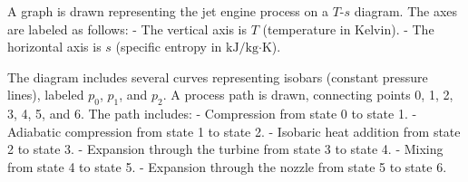 A graph is drawn representing the jet engine process on a \( T \)-\( s \) diagram. The axes are labeled as follows:  
- The vertical axis is \( T \) (temperature in Kelvin).  
- The horizontal axis is \( s \) (specific entropy in \( \text{kJ}/\text{kg·K} \)).  

The diagram includes several curves representing isobars (constant pressure lines), labeled \( p_0 \), \( p_1 \), and \( p_2 \). A process path is drawn, connecting points 0, 1, 2, 3, 4, 5, and 6. The path includes:  
- Compression from state 0 to state 1.  
- Adiabatic compression from state 1 to state 2.  
- Isobaric heat addition from state 2 to state 3.  
- Expansion through the turbine from state 3 to state 4.  
- Mixing from state 4 to state 5.  
- Expansion through the nozzle from state 5 to state 6.